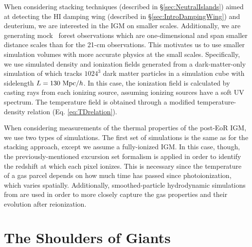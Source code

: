 When considering stacking techniques (described in \S \ref{sec:NeutralIslands}) aimed at detecting the HI damping wing (described in \S \ref{sec:IntroDampingWing}) and deuterium, we are interested in the IGM on smaller scales. Additionally, we are generating mock \lya\ forest observations which are one-dimensional and span smaller distance scales than for the 21-cm observations. This motivates us to use smaller simulation volumes with more accurate physics at the small scales. Specifically, we use simulated density and ionization fields generated from a dark-matter-only simulation of \cite{McQuinn:2007dy} which tracks $1024^{3}$ dark matter particles in a simulation cube with sidelength $L = 130\ \text{Mpc/$h$}$. In this case, the ionization field is calculated by casting rays from each ionizing source, assuming ionizing sources have a soft UV spectrum. The temperature field is obtained through a modified temperature-density relation (Eq. \ref{eq:TDrelation}).


When considering measurements of the thermal properties of the post-EoR IGM, we use two types of simulations. The first set of simulations is the same as for the stacking approach, except we assume a fully-ionized IGM. In this case, though, the previously-mentioned excursion set formalism is applied in order to identify the redshift at which each pixel ionizes. This is necessary since the temperature of a gas parcel depends on how much time has passed since photoionization, which varies spatially. Additionally, smoothed-particle hydrodynamic simulations from \cite{Lidz2010} are used in order to more closely capture the gas properties and their evolution after reionization. 

\section{The Shoulders of Giants} \label{sec:Probes}

